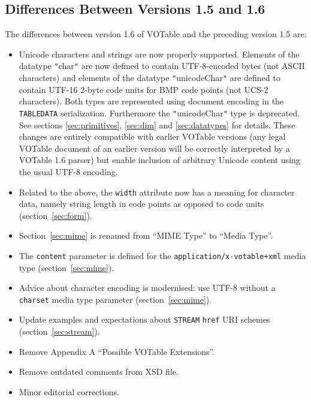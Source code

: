 \documentclass[11pt,a4paper]{ivoa}
\def\Aref#1{section~\ref{#1}}
\def\ARef#1{Section~\ref{#1}}
\let\fg=\color
\def\attr#1{{\tt{\fg{DarkRed}#1}}}
\def\elem#1{{\tt{\fg{DarkRed}#1}}}
\def\literalvalue#1{{\tt"}{{\fg{DarkPurple}#1}}{\tt"}}
\begin{document}
\subsection{Differences Between Versions 1.5 and 1.6}
\label{diff1.5-1.6}
The differences between version 1.6 of VOTable and the preceding
version 1.5 are:

\begin{itemize}
\item Unicode characters and strings are now properly supported.
      Elements of the datatype \literalvalue{char} are now defined to
      contain UTF-8-encoded bytes (not ASCII characters)
      and elements of the datatype \literalvalue{unicodeChar} are
      defined to contain UTF-16 2-byte code units for BMP code points
      (not UCS-2 characters).
      Both types are represented using document encoding in the
      \elem{TABLEDATA} serialization.
      Furthermore the \literalvalue{unicodeChar} type is deprecated.
      See sections \ref{sec:primitives}, \ref{sec:dim} and
      \ref{sec:datatypes} for details.
      These changes are entirely compatible with earlier VOTable versions
      (any legal VOTable document of an earlier version
      will be correctly interpreted by a VOTable 1.6 parser)
      but enable inclusion of arbitrary Unicode content
      using the usual UTF-8 encoding.
\item Related to the above, the \attr{width} attribute now has a meaning
      for character data, namely string length in code points
      as opposed to code units (\Aref{sec:form}).
\item \ARef{sec:mime} is renamed from ``MIME Type'' to ``Media Type''.
\item The {\tt content} parameter is defined for the
      {\tt application/x-votable+xml} media type (\Aref{sec:mime}).
\item Advice about character encoding is modernised: use UTF-8
      without a {\tt charset} media type parameter (\Aref{sec:mime}).
\item Update examples and expectations about \elem{STREAM} \attr{href}
      URI schemes (\Aref{sec:stream}).
\item Remove Appendix A ``Possible VOTable Extensions''.
\item Remove outdated comments from XSD file.
\item Minor editorial corrections.
\end{itemize}

\end{document}
